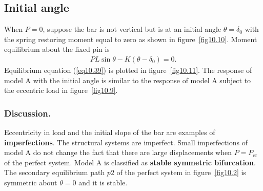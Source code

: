 \documentclass{AeroStructure-ERJohnson}
\begin{document}



\subsection{Initial angle}\label{sec10.1.5}

When $\textit{P} = 0$, suppose the bar is not vertical but is at an initial angle $\theta=\delta_{0}$ with the spring restoring moment equal to zero as shown in figure~\ref{fig10.10}. Moment equilibrium about the fixed pin is\vspace*{-6pt}
\vspace*{-2\baselineskip}
\begin{align}\label{eq10.39}
P L \sin \theta-K\left(\theta-\delta_{0}\right)=0.
\end{align}
\noindent
Equilibrium equation (\ref{eq10.39}) is plotted in figure~\ref{fig10.11}. The response of model A with the initial angle is similar to the response of model A subject to the eccentric load in figure~\ref{fig10.9}.

\subsubsection{Discussion.} Eccentricity in load and the initial slope of the bar are examples of \textbf{imperfections}. The structural systems are imperfect. Small imperfections of model A do not change the fact that there are large displacements when $P=P_{\mathrm{cr}}$ of the perfect system. Model A is classified as \textbf{stable symmetric bifurcation}. The secondary equilibrium path $p2$ of the perfect system in figure~\ref{fig10.2} is symmetric about $\theta = 0$ and it is stable.
\end{document}
